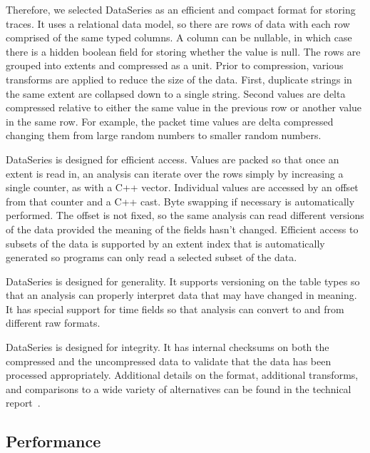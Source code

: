 Therefore, we selected DataSeries as an efficient and compact format
for storing traces.  It uses a relational data model, so
there are rows of data with each row comprised of the same typed
columns.  A column can be nullable, in which case there is a hidden
boolean field for storing whether the value is null.  The rows are
grouped into extents and compressed as a unit.  Prior to compression,
various transforms are applied to reduce the size of the data.  First,
duplicate strings in the same extent are collapsed down to a single
string.  Second values are delta compressed relative to either the
same value in the previous row or another value in the same row.  For
example, the packet time values are delta compressed changing them
from large random numbers to smaller random numbers.

DataSeries is designed for efficient access. Values are packed so that
once an extent is read in, an analysis can iterate over the rows
simply by increasing a single counter, as with a C++ vector.
Individual values are accessed by an offset from that
counter and a C++ cast.  Byte swapping if necessary is automatically
performed.  The offset is not fixed, so the same analysis can read
different versions of the data provided the meaning of the fields
hasn't changed.  Efficient access to subsets of the data is supported
by an extent index that is automatically generated so programs can
only read a selected subset of the data.

DataSeries is designed for generality. It supports versioning on the
table types so that an analysis can properly interpret data that may
have changed in meaning.  It has special support for time fields so
that analysis can convert to and from different raw formats.

DataSeries is designed for integrity.  It has internal checksums on
both the compressed and the uncompressed data to validate that the
data has been processed appropriately.  Additional details on the
format, additional transforms, and comparisons to a wide variety of
alternatives can be found in the technical
report~\cite{DSTechnicalReportSnapshot}.

\subsection{Performance}

